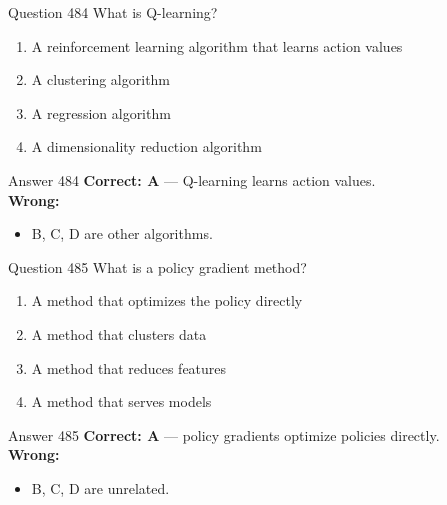 \documentclass[aspectratio=169,11pt]{beamer}
\begin{document}
	\begin{frame}{Question 484}
		What is Q-learning?
		\begin{enumerate}[label=\Alph*.]
			\item A reinforcement learning algorithm that learns action values
			\item A clustering algorithm
			\item A regression algorithm
			\item A dimensionality reduction algorithm
		\end{enumerate}
	\end{frame}
	\begin{frame}{Answer 484}
		\textbf{Correct: A} --- Q-learning learns action values.\\
		\vspace{0.5em}
		\textbf{Wrong:}
		\begin{itemize}
			\item B, C, D are other algorithms.
		\end{itemize}
	\end{frame}
	
	\begin{frame}{Question 485}
		What is a policy gradient method?
		\begin{enumerate}[label=\Alph*.]
			\item A method that optimizes the policy directly
			\item A method that clusters data
			\item A method that reduces features
			\item A method that serves models
		\end{enumerate}
	\end{frame}
	\begin{frame}{Answer 485}
		\textbf{Correct: A} --- policy gradients optimize policies directly.\\
		\vspace{0.5em}
		\textbf{Wrong:}
		\begin{itemize}
			\item B, C, D are unrelated.
		\end{itemize}
	\end{frame}
	
\end{document}
